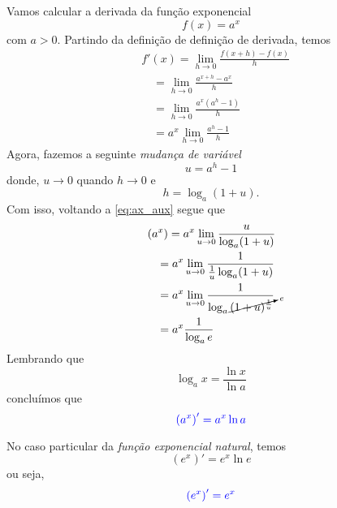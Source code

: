 Vamos calcular a derivada da função exponencial
\begin{equation}
  f(x) = a^x
\end{equation}
com $a>0$. Partindo da definição de definição de derivada, temos
\begin{align}
  & f'(x) = \lim_{h\to 0}\frac{f(x+h)-f(x)}{h}\\
  & \text{}\quad = \lim_{h\to 0}\frac{a^{x+h}-a^x}{h}\\
  & \text{}\quad = \lim_{h\to 0}\frac{a^x\left(a^h-1\right)}{h}\\
  & \text{}\quad = a^x\lim_{h\to 0}\frac{a^h-1}{h}\label{eq:ax_aux}
\end{align}
Agora, fazemos a seguinte \emph{mudança de variável}
\begin{equation}
  u = a^h-1
\end{equation}
donde, $u\to 0$ quando $h\to 0$ e
\begin{equation}
  h = \log_a(1 + u).
\end{equation}
Com isso, voltando a \eqref{eq:ax_aux} segue que
\begin{align}
  & \left(a^x\right) = a^x\lim_{u\to 0}\frac{u}{\log_a(1+u)}\\
  & \text{}\quad = a^x\lim_{u\to 0}\frac{1}{\frac{1}{u}\log_a(1+u)}\\
  & \text{}\quad = a^x\lim_{u\to 0}\frac{1}{\log_a\cancelto{e}{(1+u)^{\frac{1}{u}}}}\\
  & \text{}\quad = a^x\frac{1}{\log_a e}
\end{align}
Lembrando que
\begin{equation}
  \log_a x = \frac{\ln x}{\ln a}
\end{equation}
concluímos que
\begin{equation}
  {\color{blue}\left(a^x\right)' = a^x\ln a}
\end{equation}

No caso particular da \emph{função exponencial natural}, temos
\begin{equation}
  \left(e^x\right)' = e^x\ln e
\end{equation}
ou seja,
\begin{equation}
  {\color{blue}\left(e^x\right)' = e^x}
\end{equation}

